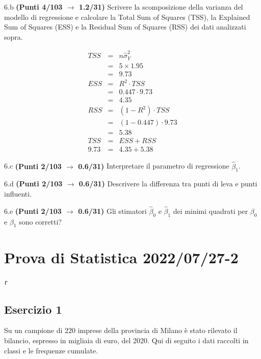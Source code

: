 \documentclass[
  11pt,
]{book}
\theoremstyle{mytheoremstyle}
\theoremstyle{mydefstyle}
\newenvironment{sol}
  {
  \begin{tcolorbox}[enhanced,breakable,arc=0.1mm,boxrule=1pt,colback=white,colframe=iblue,
  title=\bf \fontfamily{lmss}\selectfont \hspace{.5 cm} Soluzione,drop fuzzy shadow]

}{
\end{tcolorbox}
  }
\begin{document}
6.b \textbf{(Punti 4/103 \(\rightarrow\) 1.2/31)} Scrivere la scomposizione della varianza del modello di regressione
e calcolare la Total Sum of Squares (TSS), la Explained Sum of Squares (ESS) e la Residual Sum of Squares (RSS) dei dati analizzati sopra.

\begin{sol}
\begin{eqnarray*}
   TSS &=& n\hat\sigma^2_Y\\
      &=& 5 \times 1.95 \\
      &=&  9.73 \\
   ESS &=& R^2\cdot TSS\\
      &=&  0.447 \cdot 9.73 \\
      &=& 4.35 \\
   RSS &=& (1-R^2)\cdot TSS\\
      &=& (1- 0.447 )\cdot 9.73 \\
      &=&  5.38 \\
   TSS &=& ESS+RSS \\ 9.73  &=&  4.35 + 5.38 
  \end{eqnarray*}

\end{sol}

6.c \textbf{(Punti 2/103 \(\rightarrow\) 0.6/31)} Interpretare il parametro di regressione \(\hat\beta_1\).

6.d \textbf{(Punti 2/103 \(\rightarrow\) 0.6/31)} Descrivere la differenza tra punti di leva e punti influenti.

6.e \textbf{(Punti 2/103 \(\rightarrow\) 0.6/31)} Gli stimatori \(\hat\beta_0\) e \(\hat\beta_1\) dei minimi
quadrati per \(\beta_0\) e \(\beta_1\) sono corretti?

\section{Prova di Statistica 2022/07/27-2}\label{prova-di-statistica-20220727-2}

\texttt{r}

\subsection{Esercizio 1}\label{esercizio-1-17}

Su un campione di \(220\) imprese della provincia di Milano è stato
rilevato il bilancio, espresso in migliaia di euro, del 2020. Qui di seguito i dati raccolti in classi
e le frequenze cumulate.
\end{document}
